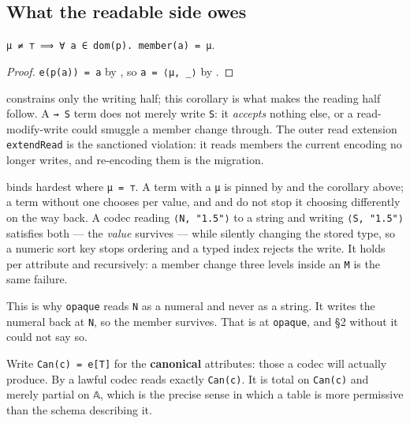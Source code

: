 \subsection{What the readable side owes}\label{corollary-read-side-w}

\begin{corollary}
\label{cor:readW}
\leanok
\texttt{μ\ ≠\ ⊤\ ⟹\ ∀\ a\ ∈\ dom(p).\ member(a)\ =\ μ}.
\end{corollary}

\begin{proof}
\leanok
\texttt{e(p(a))\ =\ a} by , so \texttt{a\ =\ ⟨μ,\ \_⟩} by .
\end{proof}

 constrains only the writing half; this corollary is what makes the reading half follow. A
\texttt{⇝\ S} term does not merely write \texttt{S}: it \emph{accepts} nothing else, or a read-modify-write could
smuggle a member change through. The outer read extension \texttt{extendRead} is the sanctioned violation: it reads members the
current encoding no longer writes, and re-encoding them is the migration.

 binds hardest where \texttt{μ\ =\ ⊤}. A term with a \texttt{μ} is pinned by  and the corollary above;
a term without one chooses per value, and  and  do not stop it choosing differently on
the way back. A codec reading \texttt{⟨N,\ "1.5"⟩} to a string and writing \texttt{⟨S,\ "1.5"⟩} satisfies both — the
\emph{value} survives — while silently changing the stored type, so a numeric sort key stops ordering and a
typed index rejects the write. It holds per attribute and recursively: a member change three levels
inside an \texttt{M} is the same failure.

This is why \texttt{opaque} reads \texttt{N} as a numeral and never as a string. It writes the numeral
back at \texttt{N}, so the member survives. That is  at \texttt{opaque}, and §2 without it could not say
so.

Write \texttt{Can(c)\ =\ e{[}T{]}} for the \textbf{canonical} attributes: those a codec will actually produce. By
 a lawful codec reads exactly \texttt{Can(c)}. It is total on \texttt{Can(c)} and merely partial on
\texttt{𝔸}, which is the precise sense in which a table is more permissive than the schema describing
it.

